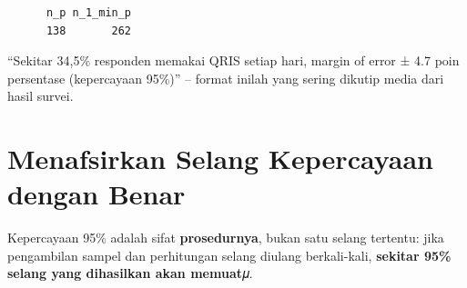 \documentclass[
  indonesian,
  letterpaper,
]{book}
\begin{document}
\begin{verbatim}
      n_p n_1_min_p 
      138       262 
\end{verbatim}

``Sekitar 34,5\% responden memakai QRIS setiap hari, margin of error ±
4.7 poin persentase (kepercayaan 95\%)'' -- format inilah yang sering
dikutip media dari hasil survei.

\section{Menafsirkan Selang Kepercayaan dengan
Benar}\label{menafsirkan-selang-kepercayaan-dengan-benar}

Kepercayaan 95\% adalah sifat \textbf{prosedurnya}, bukan satu selang
tertentu: jika pengambilan sampel dan perhitungan selang diulang
berkali-kali, \textbf{sekitar 95\% selang yang dihasilkan akan memuat}𝜇.
\end{document}
